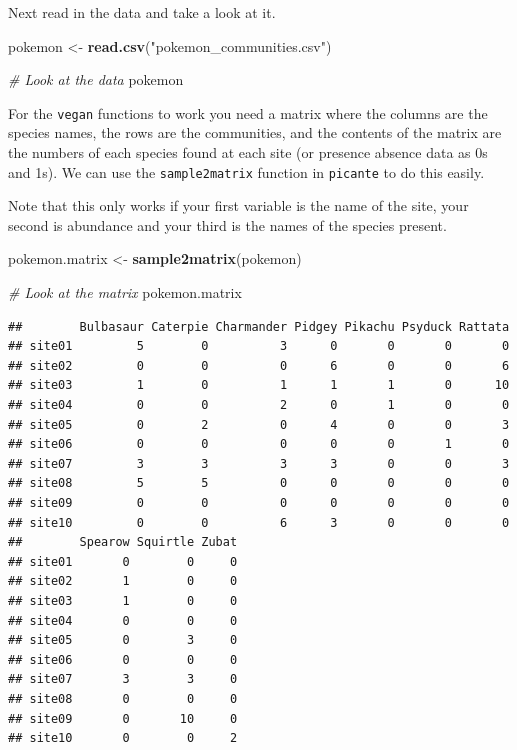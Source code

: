 \documentclass[]{book}
\newenvironment{Shaded}{\begin{snugshade}}{\end{snugshade}}
\newcommand{\KeywordTok}[1]{\textcolor[rgb]{0.13,0.29,0.53}{\textbf{{#1}}}}
\newcommand{\StringTok}[1]{\textcolor[rgb]{0.31,0.60,0.02}{{#1}}}
\newcommand{\CommentTok}[1]{\textcolor[rgb]{0.56,0.35,0.01}{\textit{{#1}}}}
\newcommand{\NormalTok}[1]{{#1}}
\theoremstyle{definition}
\theoremstyle{definition}
\theoremstyle{definition}
\theoremstyle{remark}
\begin{document}
Next read in the data and take a look at it.

\begin{Shaded}
\begin{Highlighting}[]
\NormalTok{pokemon <-}\StringTok{ }\KeywordTok{read.csv}\NormalTok{(}\StringTok{"pokemon_communities.csv"}\NormalTok{)}
\end{Highlighting}
\end{Shaded}

\begin{Shaded}
\begin{Highlighting}[]
\CommentTok{# Look at the data}
\NormalTok{pokemon}
\end{Highlighting}
\end{Shaded}

For the \texttt{vegan} functions to work you need a matrix where the
columns are the species names, the rows are the communities, and the
contents of the matrix are the numbers of each species found at each
site (or presence absence data as 0s and 1s). We can use the
\texttt{sample2matrix} function in \texttt{picante} to do this easily.

Note that this only works if your first variable is the name of the
site, your second is abundance and your third is the names of the
species present.

\begin{Shaded}
\begin{Highlighting}[]
\NormalTok{pokemon.matrix <-}\StringTok{ }\KeywordTok{sample2matrix}\NormalTok{(pokemon)}

\CommentTok{# Look at the matrix}
\NormalTok{pokemon.matrix}
\end{Highlighting}
\end{Shaded}

\begin{verbatim}
##        Bulbasaur Caterpie Charmander Pidgey Pikachu Psyduck Rattata
## site01         5        0          3      0       0       0       0
## site02         0        0          0      6       0       0       6
## site03         1        0          1      1       1       0      10
## site04         0        0          2      0       1       0       0
## site05         0        2          0      4       0       0       3
## site06         0        0          0      0       0       1       0
## site07         3        3          3      3       0       0       3
## site08         5        5          0      0       0       0       0
## site09         0        0          0      0       0       0       0
## site10         0        0          6      3       0       0       0
##        Spearow Squirtle Zubat
## site01       0        0     0
## site02       1        0     0
## site03       1        0     0
## site04       0        0     0
## site05       0        3     0
## site06       0        0     0
## site07       3        3     0
## site08       0        0     0
## site09       0       10     0
## site10       0        0     2
\end{verbatim}
\end{document}
